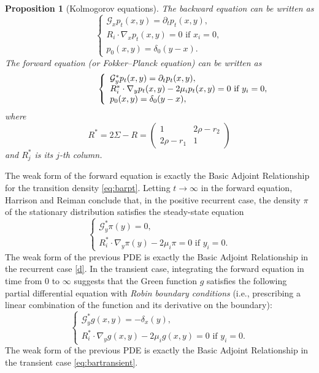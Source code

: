 \documentclass[11pt]{article}
\newtheorem{prop}[thm]{Proposition}
\theoremstyle{definition}
\begin{document}
\begin{prop}[Kolmogorov equations]
The backward equation can be written as
$$
\left\{\begin{array}{l}
\mathcal{G}_x p_t(x, y)=\partial_t p_t(x, y), \\
R_i \cdot \nabla_x p_t(x, y)=0 \text { if } x_i=0, \\
p_0(x, y)=\delta_0 (y-x) .
\end{array}\right.
$$
%
The forward equation (or Fokker–Planck equation) can be written as
$$ \hspace{2.1cm}
\left\{\begin{array}{l}
\mathcal{G}_y^* p_t(x, y)=\partial_t p_t(x, y), \\
R_i^* \cdot \nabla_y p_t(x, y)-2 \mu_i p_t(x, y)=0 \text { if } y_i=0, \\
p_0(x, y)=\delta_0 (y-x) ,
\end{array}\right.
$$
where
$$
R^*=2 \Sigma-R=
\begin{pmatrix}
1 & 2\rho-r_2
\\
2\rho-r_1 & 1
\end{pmatrix}
$$
and $R_j^*$ is its $j$-th column. 
\end{prop}
The weak form of the forward equation is exactly the Basic Adjoint Relationship for the transition density
\eqref{eq:barpt}.
Letting $t\to\infty$ in the forward equation, Harrison and Reiman conclude that, in the positive recurrent case, the density $\pi$ of the stationary distribution satisfies the steady-state equation \cite[(8.5)]{HaRe-81}
$$
\left\{\begin{array}{l}
\mathcal{G}^*_y \pi(y)=0, \\
R_i^* \cdot \nabla_y \pi(y)-2 \mu_i \pi=0 \text { if } y_i=0.
\end{array}\right.
$$
The weak form of the previous PDE is exactly the Basic Adjoint Relationship in the recurrent case \eqref{d}.
In the transient case, integrating the forward equation in time from $0$ to $\infty$ suggests that the Green function $g$ satisfies the following partial differential equation with
\emph{Robin boundary conditions} (i.e., prescribing a linear combination of the function and its derivative on the boundary):
$$
\left\{\begin{array}{l}
\mathcal{G}_y^* g(x, y)=-\delta_x(y), \\
R_i^* \cdot \nabla_y g(x, y)-2 \mu_i g(x, y)=0 \text { if } y_i=0 .
\end{array}\right.
$$
The weak form of the previous PDE is exactly the Basic Adjoint Relationship in the transient case
\eqref{eq:bartransient}.
\end{document}
